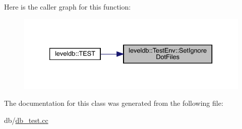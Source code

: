 Here is the caller graph for this function\+:
\nopagebreak
\begin{figure}[H]
\begin{center}
\leavevmode
\includegraphics[width=333pt]{classleveldb_1_1_test_env_a53f3533febb86f9c1d424ce329a74bf9_icgraph}
\end{center}
\end{figure}


The documentation for this class was generated from the following file\+:\begin{DoxyCompactItemize}
\item 
db/\mbox{\hyperlink{db__test_8cc}{db\+\_\+test.\+cc}}\end{DoxyCompactItemize}
